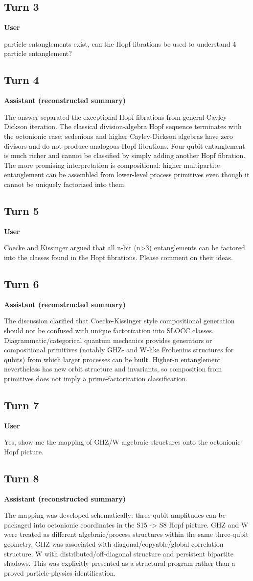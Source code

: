 \documentclass[11pt,a4paper]{article}
\newcommand{\speaker}[1]{\par\medskip\noindent\textbf{\large #1}\par\smallskip}
\begin{document}
\subsection*{Turn 3}
\speaker{User}
4 particle entanglements exist, can the Hopf fibrations be used to understand 4 particle entanglement?
\subsection*{Turn 4}
\speaker{Assistant (reconstructed summary)}
The answer separated the exceptional Hopf fibrations from general Cayley-Dickson iteration. The classical division-algebra Hopf sequence terminates with the octonionic case; sedenions and higher Cayley-Dickson algebras have zero divisors and do not produce analogous Hopf fibrations. Four-qubit entanglement is much richer and cannot be classified by simply adding another Hopf fibration. The more promising interpretation is compositional: higher multipartite entanglement can be assembled from lower-level process primitives even though it cannot be uniquely factorized into them.
\subsection*{Turn 5}
\speaker{User}
Coecke and Kissinger argued that all n-bit (n>3) entanglements can be factored into the classes found in the Hopf fibrations. Please comment on their ideas.
\subsection*{Turn 6}
\speaker{Assistant (reconstructed summary)}
The discussion clarified that Coecke-Kissinger style compositional generation should not be confused with unique factorization into SLOCC classes. Diagrammatic/categorical quantum mechanics provides generators or compositional primitives (notably GHZ- and W-like Frobenius structures for qubits) from which larger processes can be built. Higher-n entanglement nevertheless has new orbit structure and invariants, so composition from primitives does not imply a prime-factorization classification.
\subsection*{Turn 7}
\speaker{User}
Yes, show me the mapping of GHZ/W algebraic structures onto the octonionic Hopf picture.
\subsection*{Turn 8}
\speaker{Assistant (reconstructed summary)}
The mapping was developed schematically: three-qubit amplitudes can be packaged into octonionic coordinates in the S15 -> S8 Hopf picture. GHZ and W were treated as different algebraic/process structures within the same three-qubit geometry. GHZ was associated with diagonal/copyable/global correlation structure; W with distributed/off-diagonal structure and persistent bipartite shadows. This was explicitly presented as a structural program rather than a proved particle-physics identification.
\end{document}
